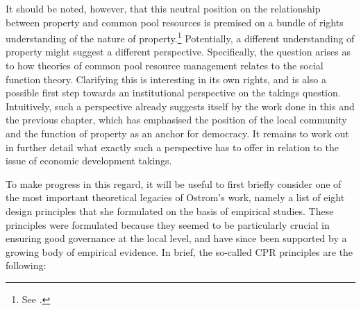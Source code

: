 

It should be noted, however, that this neutral position on the relationship between property and common pool resources is premised on a bundle of rights understanding of the nature of property.\footnote{See \cite[]{ostrom07}.} Potentially, a different understanding of property might suggest a different perspective. Specifically, the question arises as to how theories of common pool resource management relates to the social function theory. Clarifying this is interesting in its own rights, and is also a possible first step towards an institutional perspective on the takings question. Intuitively, such a perspective already suggests itself by the work done in this and the previous chapter, which has emphasised the position of the local community and the function of property as an anchor for democracy. It remains to work out in further detail what exactly such a perspective has to offer in relation to the issue of economic development takings.

To make progress in this regard, it will be useful to first briefly consider one of the most important theoretical legacies of Ostrom's work, namely a list of eight design principles that she formulated on the basis of empirical studies. These principles were formulated because they seemed to be particularly crucial in ensuring good governance at the local level, and have since been supported by a growing body of empirical evidence. In brief, the so-called CPR principles are the following:


